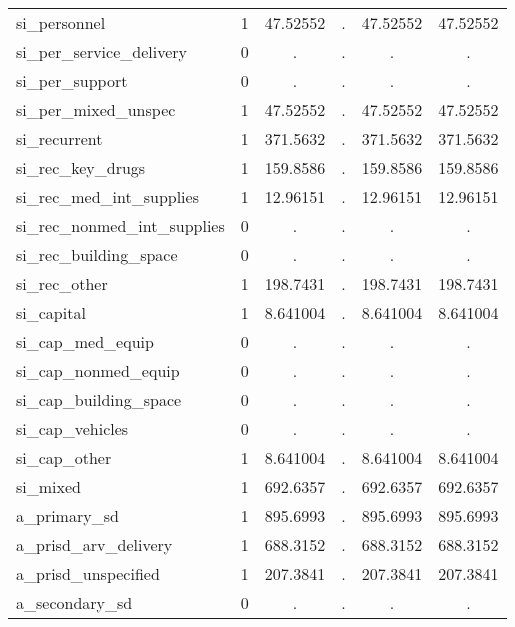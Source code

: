 \begin{table}[htbp]
\begin{tabular}{l*{1}{ccccc}}
si\_personnel&           1&    47.52552&           .&    47.52552&    47.52552\\
si\_per\_service\_delivery&           0&           .&           .&           .&           .\\
si\_per\_support&           0&           .&           .&           .&           .\\
si\_per\_mixed\_unspec&           1&    47.52552&           .&    47.52552&    47.52552\\
si\_recurrent&           1&    371.5632&           .&    371.5632&    371.5632\\
si\_rec\_key\_drugs&           1&    159.8586&           .&    159.8586&    159.8586\\
si\_rec\_med\_int\_supplies&           1&    12.96151&           .&    12.96151&    12.96151\\
si\_rec\_nonmed\_int\_supplies&           0&           .&           .&           .&           .\\
si\_rec\_building\_space&           0&           .&           .&           .&           .\\
si\_rec\_other&           1&    198.7431&           .&    198.7431&    198.7431\\
si\_capital  &           1&    8.641004&           .&    8.641004&    8.641004\\
si\_cap\_med\_equip&           0&           .&           .&           .&           .\\
si\_cap\_nonmed\_equip&           0&           .&           .&           .&           .\\
si\_cap\_building\_space&           0&           .&           .&           .&           .\\
si\_cap\_vehicles&           0&           .&           .&           .&           .\\
si\_cap\_other&           1&    8.641004&           .&    8.641004&    8.641004\\
si\_mixed    &           1&    692.6357&           .&    692.6357&    692.6357\\
a\_primary\_sd&           1&    895.6993&           .&    895.6993&    895.6993\\
a\_prisd\_arv\_delivery&           1&    688.3152&           .&    688.3152&    688.3152\\
a\_prisd\_unspecified&           1&    207.3841&           .&    207.3841&    207.3841\\
a\_secondary\_sd&           0&           .&           .&           .&           .\\

\end{tabular}
\end{table}
